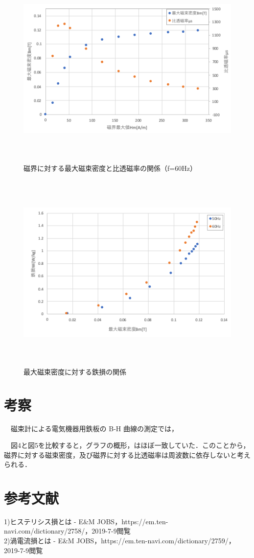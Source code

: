 \begin{figure}[H]
  \centering
  \includegraphics[height=10cm]{./fig/5.png}
  \caption{磁界に対する最大磁束密度と比透磁率の関係（f=60Hz）}
\end{figure}

\begin{figure}[H]
  \centering
  \includegraphics[height=10cm]{./fig/6.png}
  \caption{最大磁束密度に対する鉄損の関係}
\end{figure}

\newpage
\section{考察}
　磁束計による電気機器用鉄板の B-H 曲線の測定では，

　図4と図5を比較すると，グラフの概形，はほぼ一致していた．このことから，磁界に対する磁束密度，及び磁界に対する比透磁率は周波数に依存しないと考えられる．


\newpage
\section{参考文献}
1)ヒステリシス損とは - E\&M JOBS，https://em.ten-navi.com/dictionary/2758/，2019-7-9閲覧\\

2)渦電流損とは - E\&M JOBS，https://em.ten-navi.com/dictionary/2759/，2019-7-9閲覧


